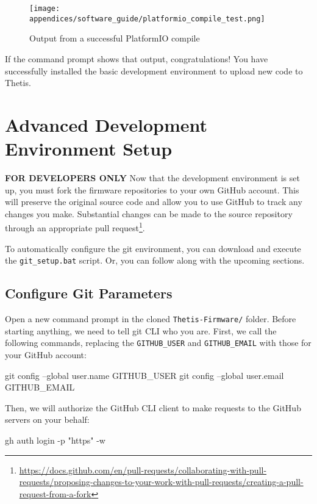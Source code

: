 \begin{figure}[h!]
    \centering
    \texttt{[image: appendices/software\_guide/platformio\_compile\_test.png]}
    \caption{Output from a successful PlatformIO compile}
\end{figure}

If the command prompt shows that output, congratulations!
You have successfully installed the basic development environment to upload new code to Thetis.

\section{Advanced Development Environment Setup}
\textbf{FOR DEVELOPERS ONLY}
Now that the development environment is set up, you must fork the firmware repositories to your own GitHub account.
This will preserve the original source code and allow you to use GitHub to track any changes you make.
Substantial changes can be made to the source repository through an appropriate pull request\footnote{\url{https://docs.github.com/en/pull-requests/collaborating-with-pull-requests/proposing-changes-to-your-work-with-pull-requests/creating-a-pull-request-from-a-fork}}.

To automatically configure the git environment, you can download and execute the \lstinline[style=customInline]|git_setup.bat| script.
Or, you can follow along with the upcoming sections.

\subsection{Configure Git Parameters}
Open a new command prompt in the cloned \lstinline[style=customInline]|Thetis-Firmware/| folder.
Before starting anything, we need to tell git CLI who you are.
First, we call the following commands, replacing the \lstinline[style=customInline]|GITHUB_USER| and \lstinline[style=customInline]|GITHUB_EMAIL| with those for your GitHub account:

\begin{bash}
    git config --global user.name GITHUB_USER
    git config --global user.email GITHUB_EMAIL
\end{bash}

Then, we will authorize the GitHub CLI client to make requests to the GitHub servers on your behalf:

\begin{bash}
    gh auth login -p "https" -w
\end{bash}

